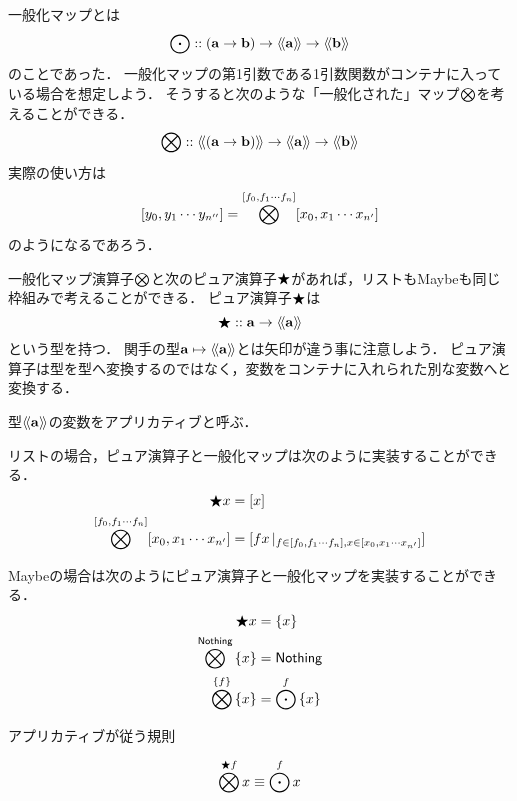 \documentclass[twocolumn]{jsbook}
\newcommand{\typename}[1]{\mathbf{#1}}
\newcommand{\listtype}[1]{[#1]}
\newcommand{\guard}[1]{\mathop{\mid_{#1}}}
\begin{document}
一般化マップとは$$\mapfunc::(\typename{a}\rightarrow\typename{b})\rightarrow\generalcontainer{\typename{a}}\rightarrow\generalcontainer{\typename{b}}$$のことであった．
一般化マップの第1引数である1引数関数がコンテナに入っている場合を想定しよう．
そうすると次のような「一般化された」マップ$\bigotimes$を考えることができる．
$$\applicativefunc::\generalcontainer{(\typename{a}\rightarrow\typename{b})}\rightarrow\generalcontainer{\typename{a}}\rightarrow\generalcontainer{\typename{b}}$$
実際の使い方は$$\listtype{y_0,y_1\dotsb y_{n''}}=\applicativefunc^{\listtype{f_0,f_1\dotsb f_n}}\listtype{x_0,x_1\dotsb x_{n'}}$$のようになるであろう．

一般化マップ演算子$\bigotimes$と次のピュア演算子$\bigstar$があれば，リストもMaybeも同じ枠組みで考えることができる．
ピュア演算子$\bigstar$は$$\pure::\typename{a}\rightarrow\generalcontainer{\typename{a}}$$という型を持つ．
関手の型$\typename{a}\mapsto\generalcontainer{\typename{a}}$とは矢印が違う事に注意しよう．
ピュア演算子は型を型へ変換するのではなく，変数をコンテナに入れられた別な変数へと変換する．

型$\generalcontainer{\typename{a}}$の変数をアプリカティブと呼ぶ．

リストの場合，ピュア演算子と一般化マップは次のように実装することができる．
\begin{align*}
\pure x&=\listtype{x}\\
\applicativefunc^{\listtype{f_0,f_1\dotsb f_n}}\listtype{x_0,x_1\dotsb x_{n'}}&=\listtype{fx\guard{f\in\listtype{f_0,f_1\dotsb f_n},x\in\listtype{x_0,x_1\dotsb x_{n'}}}}
\end{align*}

Maybeの場合は次のようにピュア演算子と一般化マップを実装することができる．
\begin{align*}
\bigstar x&=\left\{x\right\}\\
\bigotimes^{\textsf{Nothing}}\left\{x\right\}&=\textsf{Nothing}\\
\bigotimes^{\left\{f\right\}}\left\{x\right\}&=\bigodot^f\left\{x\right\}
\end{align*}



アプリカティブが従う規則

$$\bigotimes^{\bigstar f}x\equiv\bigodot^fx$$
\end{document}

